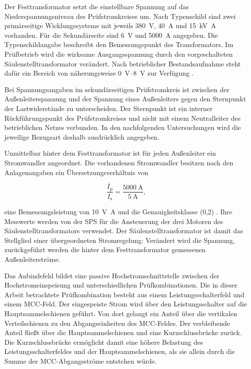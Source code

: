 Der Festtransformator setzt die einstellbare Spannung auf das
Niederspannungsniveau des Prüfstromkreises um. Nach Typenschild sind zwei
primärseitige Wicklungssysteme mit jeweils \SI{380}{\volt},
\SI{40}{\ampere} und \SI{15}{\kilo\volt\ampere} vorhanden. Für die
Sekundärseite sind \SI{6}{\volt} und \SI{5000}{\ampere} angegeben. Die
Typenschildangabe beschreibt den Bemessungspunkt des Transformators. Im
Prüfbetrieb wird die wirksame Ausgangsspannung durch den vorgeschalteten
Säulenstelltransformator verändert. Nach betrieblicher Bestandsaufnahme
steht dafür ein Bereich von näherungsweise \SIrange{0}{8}{\volt} zur
Verfügung
\parencite[Bestandsaufnahme: Festtransformator und
Betriebsbereich]{rj_pruefstand_2026}.

Bei Spannungsangaben im sekundärseitigen Prüfstromkreis ist zwischen der
Außenleiterspannung und der Spannung eines Außenleiters gegen den Sternpunkt
der Lastwiderstände zu unterscheiden. Der Sternpunkt ist ein interner
Rückführungspunkt des Prüfstromkreises und nicht mit einem Neutralleiter des
betrieblichen Netzes verbunden. In den nachfolgenden Untersuchungen wird die
jeweilige Bezugsart deshalb ausdrücklich angegeben.

Unmittelbar hinter dem Festtransformator ist für jeden Außenleiter ein
Stromwandler angeordnet. Die vorhandenen Stromwandler besitzen nach den
Anlagenangaben ein Übersetzungsverhältnis von

\begin{equation}
    \frac{I_\mathrm{p}}{I_\mathrm{s}}
    =
    \frac{\SI{5000}{\ampere}}{\SI{5}{\ampere}},
    \label{eq:ist_stromwandler_uebersetzung}
\end{equation}

eine Bemessungsleistung von \SI{10}{\volt\ampere} und die
Genauigkeitsklasse (0{,}2)
\parencite[Bestandsaufnahme: zentrale
Strommessung]{rj_pruefstand_2026}. Ihre Messwerte werden von der SPS für die
Ansteuerung der drei Motoren des Säulenstelltransformators verwendet. Der
Säulenstelltransformator ist damit das Stellglied einer übergeordneten
Stromregelung: Verändert wird die Spannung, zurückgeführt werden die hinter
dem Festtransformator gemessenen Außenleiterströme.

Das Anbindefeld bildet eine passive Hochstromschnittstelle zwischen der
Hochstromeinspeisung und unterschiedlichen Prüfkombinationen. Die in dieser
Arbeit betrachtete Prüfkombination besteht aus einem Leistungsschalterfeld
und einem MCC-Feld. Der eingespeiste Strom wird über den Leistungsschalter
auf die Hauptsammelschienen geführt. Von dort gelangt ein Anteil über die
vertikalen Verteilschienen zu den Abgangseinheiten des MCC-Feldes. Der
verbleibende Anteil fließt über die Hauptsammelschienen und eine
Kurzschlussbrücke zurück. Die Kurzschlussbrücke ermöglicht damit eine höhere
Belastung des Leistungsschalterfeldes und der Hauptsammelschienen, als sie
allein durch die Summe der MCC-Abgangsströme entstehen würde.

